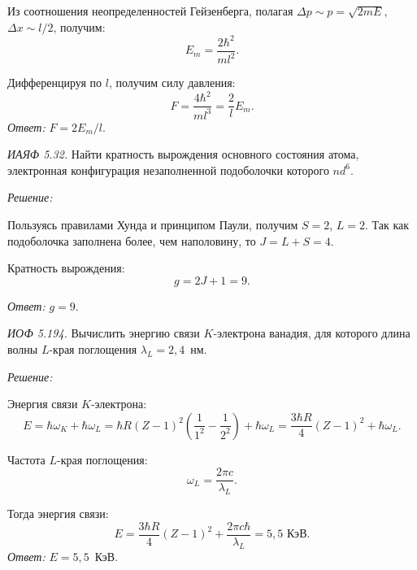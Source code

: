 Из соотношения неопределенностей Гейзенберга, полагая
\( \Delta p \sim p = \sqrt{2mE} \), \( \Delta x \sim l/2 \), получим:
\[
    E_m = \frac{2\hbar^2}{ml^2}.
\]

Дифференцируя по \( l \), получим силу давления:
\[
    F = \frac{4\hbar^2}{ml^3} = \frac{2}{l}E_m.
\]
\vspace*{2em}
\emph{Ответ:} \( F = 2E_m/l \).
\newpage

\emph{ИАЯФ 5.32.}
Найти кратность вырождения основного состояния атома, электронная
конфигурация незаполненной подоболочки которого  \( nd^6 \).

\vspace*{2em}
\emph{Решение:}

Пользуясь правилами Хунда и принципом Паули, получим \( S = 2 \), \( L = 2 \).
Так как подоболочка заполнена более, чем наполовину, то \( J = L + S = 4 \).

Кратность вырождения:
\[
    g = 2J + 1 = 9.
\]

\vspace*{1em}
\emph{Ответ:} \( g = 9 \).
\newpage

\emph{ИОФ 5.194.}
Вычислить энергию связи \( K \)-электрона ванадия, для которого длина волны
\( L \)-края поглощения \( \lambda_L = 2,\!4 \)~нм.

\vspace*{2em}
\emph{Решение:}

Энергия связи \( K \)-электрона:
\[
    E = \hbar\omega_K + \hbar\omega_L = \hbar R(Z - 1)^2\left(\frac{1}{1^2}
    - \frac{1}{2^2}\right) + \hbar\omega_L= \frac{3\hbar R}{4}(Z - 1)^2
    + \hbar\omega_L.
\]

Частота \( L \)-края поглощения:
\[
    \omega_L = \frac{2\pi c}{\lambda_L}.
\]

Тогда энергия связи:
\[
    E = \frac{3\hbar R}{4}(Z - 1)^2 + \frac{2\pi c\hbar}{\lambda_L} =
    5,5\text{ КэВ}.
\]
\vspace*{2em}
\emph{Ответ:} \( E = 5,\!5 \)~КэВ.
